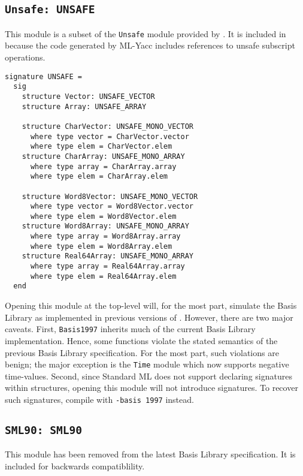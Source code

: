 \subsection{{\tt Unsafe: UNSAFE}}

This module is a subset of the {\tt Unsafe} module provided by
{\smlnj}.  It is included in {\mlton} because the code generated by
ML-Yacc includes references to unsafe subscript operations.

\begin{verbatim}
signature UNSAFE =
  sig
    structure Vector: UNSAFE_VECTOR
    structure Array: UNSAFE_ARRAY

    structure CharVector: UNSAFE_MONO_VECTOR
      where type vector = CharVector.vector
      where type elem = CharVector.elem
    structure CharArray: UNSAFE_MONO_ARRAY
      where type array = CharArray.array
      where type elem = CharArray.elem

    structure Word8Vector: UNSAFE_MONO_VECTOR
      where type vector = Word8Vector.vector
      where type elem = Word8Vector.elem
    structure Word8Array: UNSAFE_MONO_ARRAY
      where type array = Word8Array.array
      where type elem = Word8Array.elem
    structure Real64Array: UNSAFE_MONO_ARRAY
      where type array = Real64Array.array
      where type elem = Real64Array.elem
  end
\end{verbatim}


Opening this module at the top-level will, for the most part, simulate
the Basis Library as implemented in previous versions of {\mlton}.
However, there are two major caveats.  First, {\tt Basis1997} inherits
much of the current Basis Library implementation.  Hence, some
functions violate the stated semantics of the previous Basis Library
specification.  For the most part, such violations are benign; the
major exception is the {\tt Time} module which now supports negative
time-values.  Second, since Standard ML does not support declaring
signatures within structures, opening this module will not introduce
signatures.  To recover such signatures, compile with {\tt -basis
1997} instead.

\subsection{{\tt SML90: SML90}}

This module has been removed from the latest Basis Library
specification.  It is included for backwards compatiblility.
